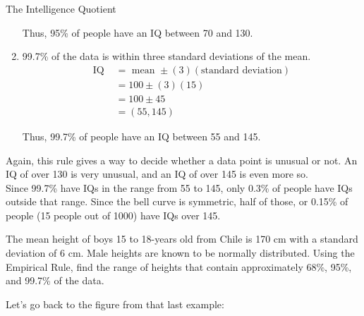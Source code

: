 \begin{example}[https://www.youtube.com/watch?v=cTRr0B5Cp8k]{The Intelligence Quotient}
\begin{enumerate}
Thus, 95\% of people have an IQ between 70 and 130.

\item 99.7\% of the data is within three standard deviations of the mean.
\begin{align*}
\textrm{IQ } &= \textrm{ mean } \pm (3)(\textrm{standard deviation})\\
&= 100 \pm (3)(15)\\
&= 100 \pm 45\\
&= \boxed{(55,145)}
\end{align*}

Thus, 99.7\% of people have an IQ between 55 and 145.
\end{enumerate}

Again, this rule gives a way to decide whether a data point is unusual or not.  An IQ of over 130 is very unusual, and an IQ of over 145 is even more so.\\

Since 99.7\% have IQs in the range from 55 to 145, only 0.3\% of people have IQs outside that range.  Since the bell curve is symmetric, half of those, or 0.15\% of people (15 people out of 1000) have IQs over 145.
\end{example}

\begin{try}
The mean height of boys 15 to 18-years old from Chile is 170 cm with a standard deviation of 6 cm. Male heights are known to be normally distributed. Using the Empirical Rule, find the range of heights that contain approximately 68\%, 95\%, and 99.7\% of the data.
\end{try}
\pagebreak
\text{}
\vfill

Let's go back to the figure from that last example:\\
\vfill

